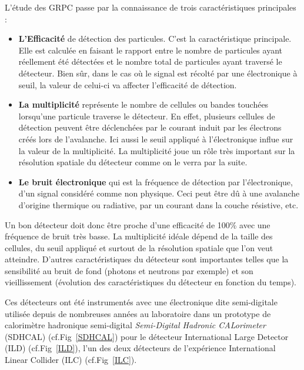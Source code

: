 L'étude des GRPC passe par la connaissance de trois caractéristiques principales :
\begin{itemize}[label=$\bullet$]
	\item \textbf{L'Efficacité} de détection des particules. C'est la caractéristique principale. Elle est calculée en faisant le rapport entre le nombre de particules ayant réellement été détectées et le nombre total de particules ayant traversé le détecteur. Bien sûr, dans le cas où le signal est récolté par une électronique à seuil, la valeur de celui-ci va affecter l'efficacité de détection.
	\item \textbf{La multiplicité} représente le nombre de cellules ou bandes touchées lorsqu'une particule traverse le détecteur. En effet, plusieurs cellules de détection peuvent être déclenchées par le courant induit par les électrons créés lors de l'avalanche. Ici aussi le seuil appliqué à l'électronique influe sur la valeur de la multiplicité. La multiplicité joue un rôle très important sur la résolution spatiale du détecteur comme on le verra par la suite.
	\item \textbf{Le bruit électronique} qui est la fréquence de détection par l'électronique, d'un signal considéré comme non physique. Ceci peut être dû à une avalanche d'origine thermique ou radiative, par un courant dans la couche résistive, etc. 
\end{itemize}

Un bon détecteur doit donc être proche d'une efficacité de 100\% avec une fréquence de bruit très basse. La multiplicité idéale dépend de la taille des cellules, du seuil appliqué et surtout de la résolution spatiale que l'on veut atteindre. D'autres caractéristiques du détecteur sont importantes telles que la sensibilité au bruit de fond (photons et neutrons par exemple) et son vieillissement (évolution des caractéristiques du détecteur en fonction du temps).

Ces détecteurs ont été instrumentés avec une électronique dite semi-digitale utilisée depuis de nombreuses années au laboratoire dans un prototype de calorimètre hadronique semi-digital \textit{Semi-Digital Hadronic CALorimeter} (SDHCAL) (cf.Fig~\ref{SDHCAL}) \cite{Buridon:2016ill} pour le détecteur International Large Detector (ILD) (cf.Fig~\ref{ILD}), l'un des deux détecteurs de l'expérience International Linear Collider (ILC) (cf.Fig~\ref{ILC}).

